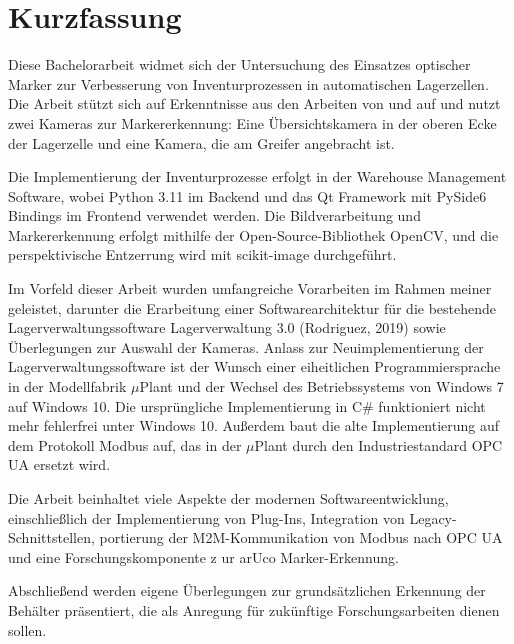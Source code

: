 \chapter*{Kurzfassung}

Diese Bachelorarbeit widmet sich der Untersuchung des Einsatzes optischer Marker zur Verbesserung von Inventurprozessen in automatischen Lagerzellen. 
Die Arbeit stützt sich auf Erkenntnisse aus den Arbeiten von \cite[Hübler (2019)]{Hübler2019} und \cite[Kistner (2017)]{LarsKistner2017}  auf
und nutzt zwei Kameras zur Markererkennung: Eine Übersichtskamera in der oberen Ecke der Lagerzelle und eine Kamera, die am Greifer angebracht ist.

Die Implementierung der Inventurprozesse erfolgt in der Warehouse Management Software, wobei Python 3.11 im Backend und das Qt Framework mit PySide6 Bindings 
im Frontend verwendet werden. 
Die Bildverarbeitung und Markererkennung erfolgt mithilfe der Open-Source-Bibliothek OpenCV, und die perspektivische 
Entzerrung wird mit scikit-image durchgeführt.

Im Vorfeld dieser Arbeit wurden umfangreiche Vorarbeiten im Rahmen meiner \cite[Semesterarbeit]{Semesterarbeit} geleistet, 
darunter die Erarbeitung einer Softwarearchitektur für die bestehende Lagerverwaltungssoftware Lagerverwaltung 3.0 (Rodriguez, 2019) 
sowie Überlegungen zur Auswahl der Kameras. Anlass zur Neuimplementierung der Lagerverwaltungssoftware ist der Wunsch einer 
eiheitlichen Programmiersprache in der Modellfabrik $\mu$Plant und der Wechsel des Betriebssystems von Windows 7 auf Windows 10.
Die ursprüngliche Implementierung in C$\#$ funktioniert nicht mehr fehlerfrei unter Windows 10.
Außerdem baut die alte Implementierung auf dem Protokoll Modbus auf, das in der $\mu$Plant durch den Industriestandard OPC UA ersetzt wird.

Die Arbeit beinhaltet viele Aspekte der modernen Softwareentwicklung, einschließlich der Implementierung von Plug-Ins, 
Integration von Legacy-Schnittstellen, portierung der M2M-Kommunikation von Modbus nach OPC UA und eine Forschungskomponente z
ur arUco Marker-Erkennung. 

Abschließend werden eigene Überlegungen zur grundsätzlichen Erkennung der Behälter präsentiert, 
die als Anregung für zukünftige Forschungsarbeiten dienen sollen.


